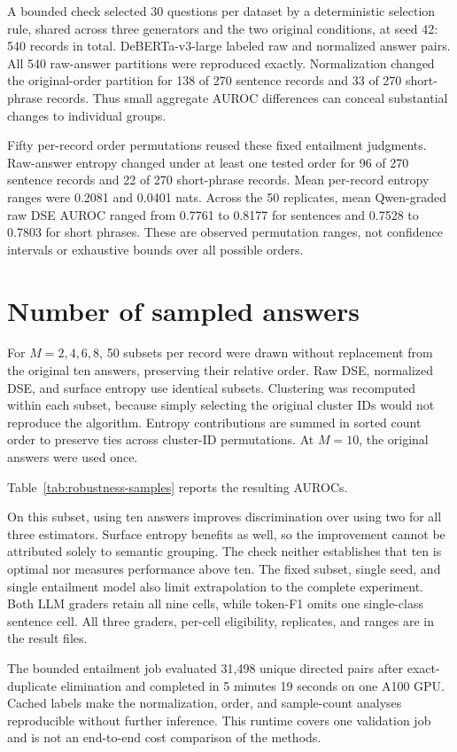 A bounded check selected 30 questions per dataset by a deterministic selection rule,
shared across three generators and the two original conditions, at seed 42:
540 records in total. DeBERTa-v3-large labeled raw
and normalized answer pairs. All 540 raw-answer partitions were reproduced
exactly. Normalization changed the original-order partition for 138 of 270
sentence records and 33 of 270 short-phrase records. Thus small aggregate
AUROC differences can conceal substantial changes to individual groups.

Fifty per-record order permutations reused these fixed entailment judgments.
Raw-answer entropy changed under at least one tested order for 96 of 270
sentence records and 22 of 270 short-phrase records. Mean per-record entropy
ranges were 0.2081 and 0.0401 nats. Across the 50 replicates, mean Qwen-graded
raw DSE AUROC ranged from 0.7761 to 0.8177 for sentences and 0.7528 to 0.7803
for short phrases. These are observed permutation ranges, not confidence
intervals or exhaustive bounds over all possible orders.

\section{Number of sampled answers}

For $M=2,4,6,8$, 50 subsets per record were drawn without replacement from
the original ten answers, preserving their relative order. Raw DSE, normalized
DSE, and surface entropy use identical subsets. Clustering was recomputed
within each subset, because simply selecting the original cluster IDs would not
reproduce the algorithm. Entropy contributions are summed in sorted count
order to preserve ties across cluster-ID permutations. At $M=10$, the original answers were used once.

Table~\ref{tab:robustness-samples} reports the resulting AUROCs.


On this subset, using ten answers improves discrimination over using two
for all three estimators. Surface entropy benefits as well, so the improvement
cannot be attributed solely to semantic grouping. The check neither establishes
that ten is optimal nor measures performance above ten. The fixed subset,
single seed, and single entailment model also limit extrapolation to the
complete experiment. Both LLM graders retain all nine cells, while token-F1 omits
one single-class sentence cell. All three graders, per-cell eligibility,
replicates, and ranges are in the result files.

The bounded entailment job evaluated 31,498 unique directed pairs after
exact-duplicate elimination and completed in 5 minutes 19 seconds on one
A100 GPU. Cached labels make the normalization, order, and sample-count
analyses reproducible without further inference. This runtime covers one
validation job and is not an end-to-end cost comparison of the methods.

